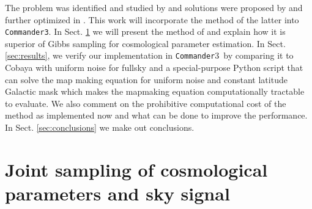 \documentclass[twocolumn]{../common/aa}
\def\commander{\texttt{Commander}}
\def\commanderthree{\texttt{Commander3}}
\begin{document}
The problem was identified and studied by \cite{Eriksen:2004ss} and solutions were proposed by \cite{jewell:2009} and further optimized in \citet{racine:2016}. This work will incorporate the method of the latter into \commanderthree. In Sect. \ref{sec:methods} we will present the method of \citet{racine:2016} and explain how it is superior of Gibbs sampling for cosmological parameter estimation. In Sect. \ref{sec:results}, we verify our implementation in \commander3\ by comparing it to Cobaya with uniform noise for fullsky and a special-purpose Python script that can solve the map making equation for uniform noise and constant latitude Galactic mask which makes the mapmaking equation computationally tractable to evaluate. We also comment on the prohibitive computational cost of the method as implemented now and what can be done to improve the performance. In Sect. \ref{sec:conclusions} we make out conclusions.

\section{Joint sampling of cosmological parameters and sky signal}
\label{sec:methods}
\end{document}
